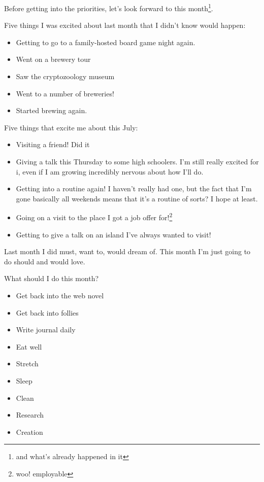 \documentclass[12pt]{article}
\renewcommand{\,}{\textsuperscript{,}}
\begin{document}
Before getting into the priorities, let's look forward to this month\footnote{and what's already happened in it}.

Five things I was excited about last month that I didn't know would happen:

\begin{itemize}

\item Getting to go to a family-hosted board game night again.  
\item Went on a brewery tour  
\item Saw the cryptozoology museum  
\item Went to a number of breweries!  
\item Started brewing again.  
\end{itemize}

Five things that excite me about this July:

\begin{itemize}

\item Visiting a friend! Did it  
\item Giving a talk this Thursday to some high schoolers. I'm still really excited for i, even if I am growing incredibly nervous about how I'll do.  
\item Getting into a routine again! I haven't really had one, but the fact that I'm gone basically all weekends means that it's a routine of sorts? I hope at least.  
\item Going on a visit to the place I got a job offer for!\footnote{woo! employable}  
\item Getting to give a talk on an island I've always wanted to visit!

\end{itemize}

Last month I did must, want to, would dream of. This month I'm just going to do should and would love.

What should I do this month?

\begin{itemize}

\item Get back into the web novel  
\item Get back into follies  
\item Write journal daily  
\item Eat well  
\item Stretch  
\item Sleep  
\item Clean  
\item Research  
\item Creation

\end{itemize}
\end{document}

